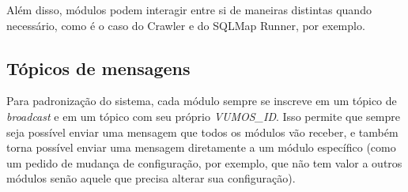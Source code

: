     Além disso, módulos podem interagir entre si de maneiras distintas quando necessário, como é o caso do Crawler e do SQLMap Runner, por exemplo.
    
    \subsection{Tópicos de mensagens}
    
    Para padronização do sistema, cada módulo sempre se inscreve em um tópico de \textit{broadcast} e em um tópico com seu próprio \textit{VUMOS\_ID}. Isso permite que sempre seja possível enviar uma mensagem que todos os módulos vão receber, e também torna possível enviar uma mensagem diretamente a um módulo específico (como um pedido de mudança de configuração, por exemplo, que não tem valor a outros módulos senão aquele que precisa alterar sua configuração).
    

    







% 
